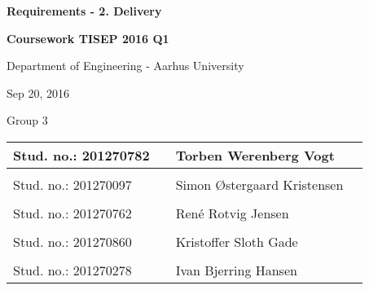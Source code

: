 
\centerline{\Huge\bfseries\color{ThemeColor} Requirements - 2. Delivery}

\vspace{1em}
\centerline{\Large\bfseries\color{BlackColor} Coursework TISEP 2016 Q1}



\vspace{5em}
\centerline{\large\bfseries\color{BlackColor}}
\centerline{\large\color{BlackColor}Department of Engineering - Aarhus University}

\vspace{0.5em}
\centerline{\large\color{BlackColor} Sep 20, 2016}

\vspace{0.5em}
\centerline{\large\color{BlackColor} Group 3}

\vspace{25em}

\begin{center}
   \begin{tabular}{ l p{3cm} l l }
   Stud. no.: 201270782 && Torben Werenberg Vogt & \\\hline
   & & \\
   Stud. no.: 201270097 && Simon Østergaard Kristensen & \\\hline
   & & \\
   Stud. no.: 201270762 && René Rotvig Jensen & \\\hline
   & & \\
   Stud. no.: 201270860 && Kristoffer Sloth Gade & \\\hline
   & & \\
   Stud. no.: 201270278 &&  Ivan Bjerring Hansen & \\\hline
   \end{tabular}
\end{center}
\thispagestyle{empty} %
\restoregeometry

